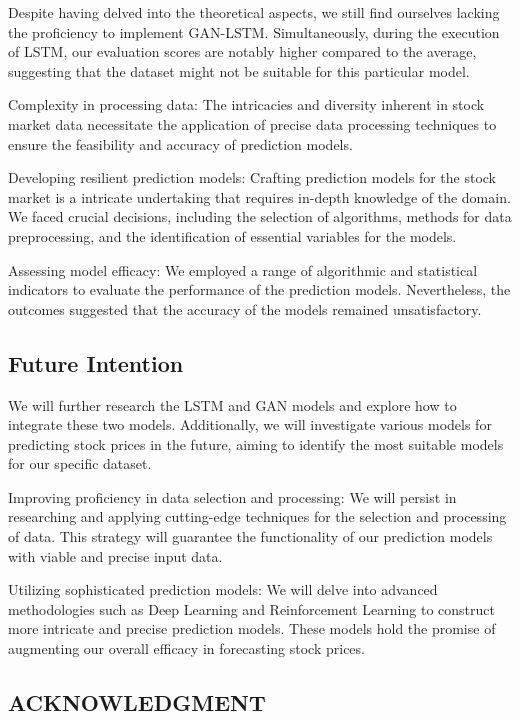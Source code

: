 \documentclass{ieeeojies}
\begin{document}
\hspace{0.3cm}Despite having delved into the theoretical aspects, we still find ourselves lacking the proficiency to implement GAN-LSTM. Simultaneously, during the execution of LSTM, our evaluation scores are notably higher compared to the average, suggesting that the dataset might not be suitable for this particular model.

Complexity in processing data: The intricacies and diversity inherent in stock market data necessitate the application of precise data processing techniques to ensure the feasibility and accuracy of prediction models.

Developing resilient prediction models: Crafting prediction models for the stock market is a intricate undertaking that requires in-depth knowledge of the domain. We faced crucial decisions, including the selection of algorithms, methods for data preprocessing, and the identification of essential variables for the models.

Assessing model efficacy: We employed a range of algorithmic and statistical indicators to evaluate the performance of the prediction models. Nevertheless, the outcomes suggested that the accuracy of the models remained unsatisfactory.

\subsection{Future Intention}

\hspace{0.3 cm}We will further research the LSTM and GAN models and explore how to integrate these two models. Additionally, we will investigate various models for predicting stock prices in the future, aiming to identify the most suitable models for our specific dataset.

Improving proficiency in data selection and processing: We will persist in researching and applying cutting-edge techniques for the selection and processing of data. This strategy will guarantee the functionality of our prediction models with viable and precise input data.

Utilizing sophisticated prediction models: We will delve into advanced methodologies such as Deep Learning and Reinforcement Learning to construct more intricate and precise prediction models. These models hold the promise of augmenting our overall efficacy in forecasting stock prices.

\subsection*{ACKNOWLEDGMENT}
\end{document}
